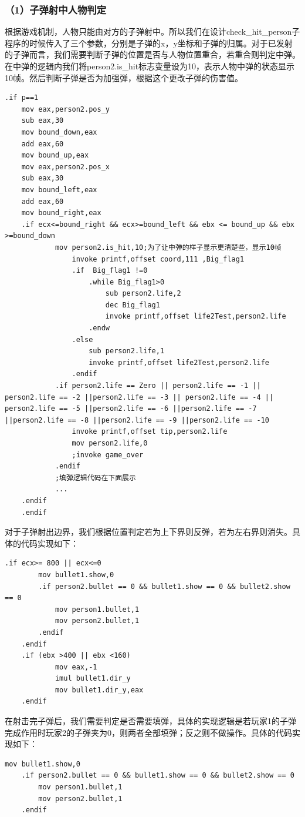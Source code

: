 \subsubsection{（1）子弹射中人物判定}
根据游戏机制，人物只能由对方的子弹射中。所以我们在设计check\_hit\_person子程序的时候传入了三个参数，分别是子弹的x，y坐标和子弹的归属。对于已发射的子弹而言，我们需要判断子弹的位置是否与人物位置重合，若重合则判定中弹。在中弹的逻辑内我们将person2.is\_hit标志变量设为10，表示人物中弹的状态显示10帧。然后判断子弹是否为加强弹，根据这个更改子弹的伤害值。
\begin{lstlisting}[language={[x86masm]Assembler}]
	.if p==1
	mov eax,person2.pos_y
	sub eax,30
	mov bound_down,eax
	add eax,60
	mov bound_up,eax
	mov eax,person2.pos_x
	sub eax,30
	mov bound_left,eax
	add eax,60
	mov bound_right,eax
	.if ecx<=bound_right && ecx>=bound_left && ebx <= bound_up && ebx >=bound_down
			mov person2.is_hit,10;为了让中弹的样子显示更清楚些，显示10帧
				invoke printf,offset coord,111 ,Big_flag1
				.if  Big_flag1 !=0
					.while Big_flag1>0
						sub person2.life,2
						dec Big_flag1
						invoke printf,offset life2Test,person2.life
					.endw
				.else 
					sub person2.life,1
					invoke printf,offset life2Test,person2.life
				.endif
			.if person2.life == Zero || person2.life == -1 || person2.life == -2 ||person2.life == -3 || person2.life == -4 || person2.life == -5 ||person2.life == -6 ||person2.life == -7 ||person2.life == -8 ||person2.life == -9 ||person2.life == -10
				invoke printf,offset tip,person2.life
				mov person2.life,0
				;invoke game_over
			.endif 
			;填弹逻辑代码在下面展示
            ...
	.endif
	.endif
\end{lstlisting}
\par
对于子弹射出边界，我们根据位置判定若为上下界则反弹，若为左右界则消失。具体的代码实现如下：
\begin{lstlisting}[language={[x86masm]Assembler}]
	.if ecx>= 800 || ecx<=0
		mov bullet1.show,0
		.if person2.bullet == 0 && bullet1.show == 0 && bullet2.show == 0
			mov person1.bullet,1
			mov person2.bullet,1
		.endif
	.endif
	.if (ebx >400 || ebx <160)
			mov eax,-1
			imul bullet1.dir_y
			mov bullet1.dir_y,eax
	.endif
\end{lstlisting}
\par
在射击完子弹后，我们需要判定是否需要填弹，具体的实现逻辑是若玩家1的子弹完成作用时玩家2的子弹夹为0，则两者全部填弹；反之则不做操作。具体的代码实现如下：
\begin{lstlisting}[language={[x86masm]Assembler}]
    mov bullet1.show,0
    .if person2.bullet == 0 && bullet1.show == 0 && bullet2.show == 0
        mov person1.bullet,1
        mov person2.bullet,1
    .endif
\end{lstlisting}
